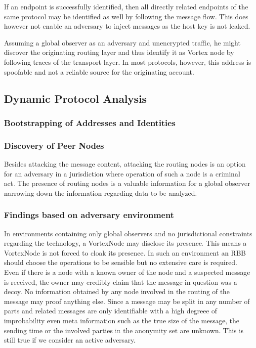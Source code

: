 \documentclass[10pt,journal,compsoc]{IEEEtran}
\begin{document}
If an endpoint is successfully identified, then all directly related endpoints of the same protocol may be identified as well by following the message flow. This does however not enable an adversary to inject messages as the host key is not leaked. 

Assuming a global observer as an adversary and unencrypted traffic, he might discover the originating routing layer and thus identify it as Vortex node by following traces of the transport layer. In most protocols, however, this address is spoofable and not a reliable source for the originating account.


\subsection{Dynamic Protocol Analysis}

\subsubsection{Bootstrapping of Addresses and Identities}


\subsubsection{Discovery of Peer Nodes}
Besides attacking the message content, attacking the routing nodes is an option for an adversary in a jurisdiction where operation of such a node is a criminal act. The presence of routing nodes is a valuable information for a global observer narrowing down the information regarding data to be analyzed.

\subsubsection{Findings based on adversary environment}
In environments containing only global observers and no jurisdictional constraints regarding the technology, a VortexNode may disclose its presence. This means a VortexNode is not forced to cloak its presence. In such an environment an RBB should choose the operations to be sensible but no extensive care is required. Even if there is a node with a known owner of the node and a suspected message is received, the owner may credibly claim that the message in question was a decoy. No information obtained by any node involved in the routing of the message may proof anything else. Since a message may be split in any number of parts and related messages are only identifiable with a high degreee of improbability even meta information such as the true size of the message, the sending time or the involved parties in the anonymity set are unknown. This is still true if we consider an active adversary.
\end{document}

